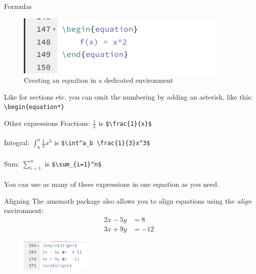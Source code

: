\documentclass{beamer}
\begin{document}
\begin{frame}[fragile]{Formulas}
\begin{figure}
    \centering
    \includegraphics[scale=0.4]{equation.png}
    \caption{Creating an equation in a dedicated environment}
    \label{fig:equation}
\end{figure}  

Like for sections etc. you can omit the numbering by adding an asterisk, like this: \verb|\begin{equation*}|
\end{frame}

\begin{frame}[fragile]{Other expressions}
Fractions: $\frac{1}{x}$ is \verb|$\frac{1}{x}$|\\~\\
Integral: $\int^a_b \frac{1}{3}x^3$ is \verb|$\int^a_b \frac{1}{3}x^3$|\\~\\
Sum: $\sum_{i=1}^n$ is \verb|$\sum_{i=1}^n$|\\~\\
You can use as many of these expressions in one equation as you need. 
\end{frame}

\begin{frame}[fragile]{Aligning}
The amsmath package also allows you to align equations using the \textit{align} environment:\\
\begin{align*} 
2x - 5y &=  8 \\ 
3x + 9y &=  -12
\end{align*}
\begin{figure}
    \centering
    \includegraphics[width=0.3\textwidth]{align.png}
\end{figure}
\end{frame}
\end{document}
